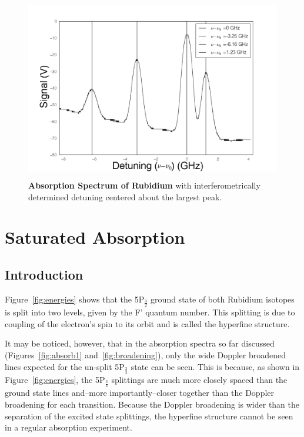 \documentclass[paper=a4, fontsize=11pt]{scrartcl} %
\numberwithin{equation}{section}
\numberwithin{figure}{section}
\numberwithin{table}{section}
\begin{document}
\begin{figure}[h] \begin{center}
  \includegraphics[height=80mm]{Detuning.png}
  \caption{\textbf{Absorption Spectrum of Rubidium } with
      interferometrically determined detuning centered about the largest peak. }
  \label{fig:detuning}
\end{center} \end{figure}

\section{Saturated Absorption}

\subsection{Introduction}
\label{sec:satabintro}
Figure~\ref{fig:energies} shows that the 5P$_{\frac{3}{2}}$
ground state of both Rubidium isotopes is split into two levels, given by the F' quantum
number. This splitting is due to coupling of the electron's spin to
its orbit and is called the hyperfine structure. 

It may be noticed, however, that in the absorption spectra so far discussed
(Figures~\ref{fig:absorb1} and~\ref{fig:broadening}), only
the wide Doppler broadened lines expected for the un-split
5P$_{\frac{3}{2}}$ state can be seen. This is because, as shown in Figure~\ref{fig:energies}, the 5P$_{\frac{3}{2}}$ splittings are much
more closely spaced than the ground state lines and--more importantly--closer together than the Doppler broadening for each
transition. Because the Doppler broadening is wider than the
separation of the excited state splittings, the hyperfine structure cannot be seen in a
regular absorption experiment.
\end{document}
